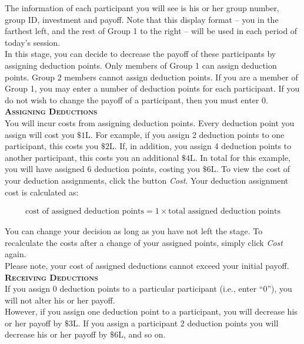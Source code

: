 \documentclass[12pt]{article}
\begin{document}
The information of each participant you will see is his or her group number, group ID, investment and payoff. Note that this display format -- you in the farthest left, and the rest of Group 1 to the right -- will be used in each period of today's session.\\

In this stage, you can decide to decrease the payoff of these participants by assigning deduction points. Only members of Group 1 can assign deduction points.  Group 2 members cannot assign deduction points. 
If you are a member of Group 1, you may enter a number of deduction points for each participant. If you do not wish to change the payoff of a participant, then you must enter 0.\\ 

{\bf \scshape Assigning Deductions}\\

You will incur costs from assigning deduction points. Every deduction point you assign will cost you $\$1\text{L}$. For example, if you assign 2 deduction points to one participant, this costs you $\$2\text{L}$. If, in addition, you assign 4 deduction points to another participant, this costs you an additional $\$4\text{L}$. In total for this example, you will have assigned 6 deduction points, costing you $\$6\text{L}$.  To view the cost of your deduction assignments, click the button {\em Cost}. Your deduction assignment cost is calculated as: 

\begin{align*}
\text{cost of assigned deduction points} = 1 \times \text{total assigned deduction points}
\end{align*}

You can change your decision as long as you have not left the stage. To recalculate the costs after a change of your assigned points, simply click {\em Cost} again.\\

Please note, your cost of assigned deductions cannot exceed your initial payoff.\\

{\bf \scshape Receiving Deductions}\\

If you assign 0 deduction points to a particular participant (i.e., enter ``0''), you will not alter his or her payoff.\\

However, if you assign one deduction point to a participant, you will decrease his or her payoff by $\$3\text{L}$. If you assign a participant 2 deduction points you will decrease his or her payoff by $\$6\text{L}$, and so on.\\ 
\end{document}
